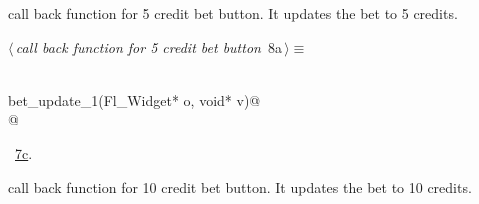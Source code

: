 \documentclass{article}
\renewcommand{\NWtarget}[2]{\hypertarget{#1}{#2}}
\renewcommand{\NWlink}[2]{\hyperlink{#1}{#2}}
\begin{document}
call back function for 5 credit bet button. It updates the bet to 5 credits.
\begin{flushleft} \small
\begin{minipage}{\linewidth}\label{scrap10}\raggedright\small
\NWtarget{nuweb8a}{} $\langle\,${\it call back function for 5 credit bet button}\nobreak\ {\footnotesize {8a}}$\,\rangle\equiv$
\vspace{-1ex}
\begin{list}{}{} \item
\mbox{}\verb@@\\
\mbox{}\verb@void bet_update_1(Fl_Widget* o, void* v)@\\
\mbox{}@\\
\mbox{}\verb@@{\NWsep}
\end{list}
\vspace{-1.5ex}
\footnotesize
\begin{list}{}{\setlength{\itemsep}{-\parsep}\setlength{\itemindent}{-\leftmargin}}
\item \NWtxtMacroRefIn\ \NWlink{nuweb7c}{7c}.

\item{}
\end{list}
\end{minipage}\vspace{4ex}
\end{flushleft}
call back function for 10 credit bet button. It updates the bet to 10 credits.
\end{document}

